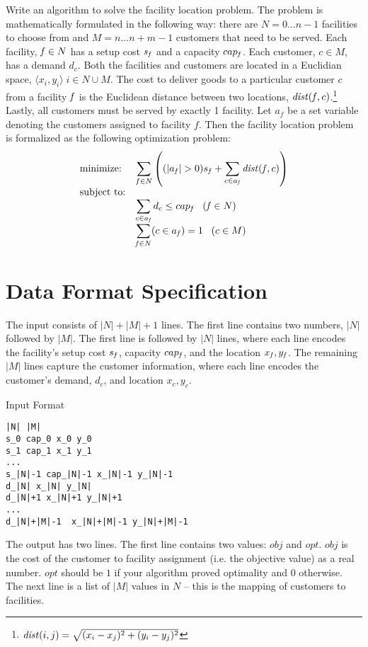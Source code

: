 \documentclass[11pt]{article}
\begin{document}
Write an algorithm to solve the facility location problem.  The problem is mathematically formulated in the following way:  there are $N = 0 \ldots n-1$ facilities to choose from and $M = n \ldots n+m-1$ customers that need to be served.  Each facility, ${\it f} \in N$ has a setup cost $s_{\it f}$ and a capacity $cap_{\it f}$.  Each customer, $c \in M$, has a demand $d_c$.  Both the facilities and customers are located in a Euclidian space, $\langle x_i,y_i \rangle \; i \in N \cup M$.  The cost to deliver goods to a particular customer $c$ from a facility ${\it f}$ is the Euclidean distance between two locations, ${\it dist}({\it f},c)$.\footnote{${\it dist}(i,j) = \sqrt{(x_{i} - x_{j})^2 + (y_{i} - y_{j})^2}$}  Lastly, all customers must be served by exactly 1 facility.  Let $a_f$ be a set variable denoting the customers assigned to facility $f$.  Then the facility location problem is formalized as the following optimization problem:
$$
\begin{array}{ll}
\mbox{minimize:} & \displaystyle \sum_{f \in N} \left( (|a_{\it f}| > 0) s_{\it f} + \sum_{c \in a_{\it f}} {\it dist}({\it f},c) \right) \\
\mbox{subject to:} & \\
     & \displaystyle \sum_{c \in a_{\it f}}  d_c \leq cap_{\it f} \;\;\; ({\it f} \in N)\\
     & \displaystyle \sum_{{\it f} \in N}  (c \in a_{\it f}) = 1 \;\;\; (c \in M) 
\end{array}
$$

\clearpage
\section{Data Format Specification}

The input consists of $|N| + |M| + 1$ lines.  The first line contains two numbers, $|N|$ followed by $|M|$.
The first line is followed by $|N|$ lines, where each line encodes the facility's setup cost $s_{\it f}$, capacity $cap_{\it f}$, and the location $x_{\it f}, y_{\it f}$.  The remaining $|M|$ lines capture the customer information, where each line encodes the customer's demand, $d_c$, and location $x_c, y_c$.

\vspace{0.2cm}
\noindent
Input Format
\vspace{-0.2cm}
\begin{Verbatim}[frame=single]
|N| |M|
s_0 cap_0 x_0 y_0
s_1 cap_1 x_1 y_1
...
s_|N|-1 cap_|N|-1 x_|N|-1 y_|N|-1
d_|N| x_|N| y_|N|
d_|N|+1 x_|N|+1 y_|N|+1
...
d_|N|+|M|-1  x_|N|+|M|-1 y_|N|+|M|-1
\end{Verbatim}
%
The output has two lines.  The first line contains two values: $obj$ and $opt$.  $obj$ is the cost of the customer to facility assignment (i.e. the objective value) as a real number.  $opt$ should be $1$ if your algorithm proved optimality and $0$ otherwise.  The next line is a list of $|M|$ values in $N$ -- this is the mapping of customers to facilities.
\end{document}
